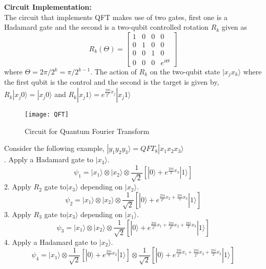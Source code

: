 \documentclass[12pt]{report}
\begin{document}
\newline
\textbf{Circuit Implementation:}\\
The circuit that implements QFT makes use of two gates, first one is a Hadamard gate and the second  is a two-qubit controlled rotation $R_k$ given as\\
\begin{equation}
R_k(\Theta) = \left[
\begin{matrix}
1 & 0 & 0 & 0\\
0 & 1 & 0 & 0\\
0 & 0 & 1 & 0\\
0 & 0 & 0 & e^{i\Theta}
\end{matrix}
\right]
\end{equation} 
where $\Theta = 2\pi/2^k = \pi / 2^{k-1}$. The action of $R_k$ on the two-qubit state $|x_jx_k\rangle$ where the first qubit is the control and the second is the target is given by, $R_k|x_j0\rangle = |x_j0\rangle$ and $R_k|x_j1\rangle = e^{\frac{2\pi i}{2^k}x_j}|x_j1\rangle$
\begin{figure}[h]
\centering
\texttt{[image: QFT]}
\caption{Circuit for Quantum Fourier Transform}
\label{fig:QFT}
\end{figure}
\linebreak 
Consider the following example, $|y_1y_2y_3\rangle = QFT_8|x_1x_2x_3\rangle$\\ . Apply a Hadamard gate to $|x_3\rangle$.
\begin{equation}
\psi_1 = |x_1\rangle  \otimes |x_2\rangle \otimes \frac{1}{\sqrt{2}}\left[|0\rangle + e^{\frac{2\pi i}{2}x_3}|1\rangle\right]
\end{equation}
2. Apply $R_2$ gate to$|x_3\rangle$ depending on $|x_2\rangle$.
\begin{equation}
\psi_2 = |x_1\rangle  \otimes |x_2\rangle \otimes \frac{1}{\sqrt{2}}\left[|0\rangle + e^{\frac{2\pi i}{2^2}x_2 + \frac{2\pi i}{2}x_3}|1\rangle\right]
\end{equation}
3. Apply $R_3$ gate to$|x_3\rangle$ depending on $|x_1\rangle$.
\begin{equation}
\psi_3 = |x_1\rangle  \otimes |x_2\rangle \otimes \frac{1}{\sqrt{2}}\left[|0\rangle + e^{\frac{2\pi i}{2^3}x_1 + \frac{2\pi i}{2^2}x_2 + \frac{2\pi i}{2}x_3}|1\rangle\right]
\end{equation}
4.  Apply a Hadamard gate to $|x_2\rangle$.
\begin{equation}
\psi_4 = |x_1\rangle  \otimes  \frac{1}{\sqrt{2}}\left[|0\rangle + e^{\frac{2\pi i}{2}x_2}|1\rangle\right] \otimes \frac{1}{\sqrt{2}}\left[|0\rangle + e^{\frac{2\pi i}{2^3}x_1 + \frac{2\pi i}{2^2}x_2 + \frac{2\pi i}{2}x_3}|1\rangle\right]
\end{equation}
\end{document}
